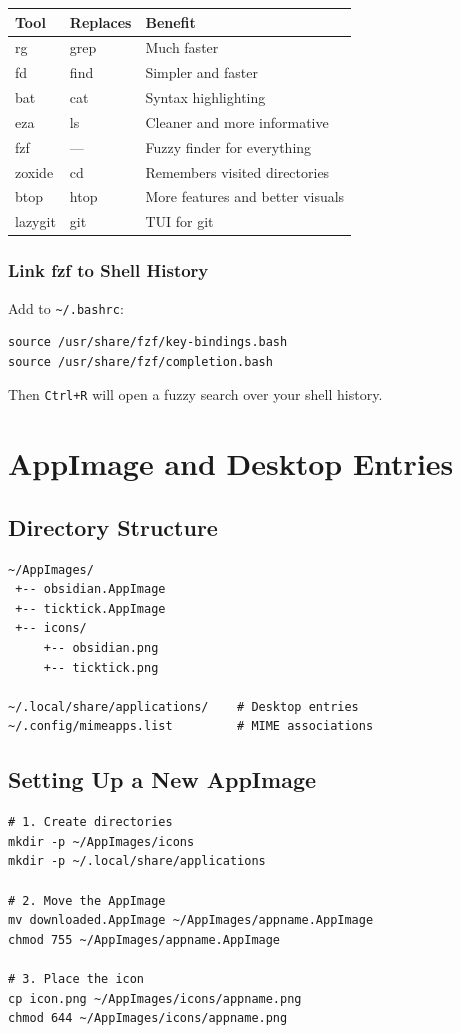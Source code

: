\documentclass[12pt, a4paper]{book}
\begin{document}
\begin{center}
\begin{tabularx}{0.9\textwidth}{llL}
\toprule
\textbf{Tool} & \textbf{Replaces} & \textbf{Benefit} \\
\midrule
rg      & grep  & Much faster \\
fd      & find  & Simpler and faster \\
bat     & cat   & Syntax highlighting \\
eza     & ls    & Cleaner and more informative \\
fzf     & ---   & Fuzzy finder for everything \\
zoxide  & cd    & Remembers visited directories \\
btop    & htop  & More features and better visuals \\
lazygit & git   & TUI for git \\
\bottomrule
\end{tabularx}
\end{center}

\subsection{Link fzf to Shell History}
Add to \texttt{\textasciitilde/.bashrc}:
\begin{lstlisting}
source /usr/share/fzf/key-bindings.bash
source /usr/share/fzf/completion.bash
\end{lstlisting}
Then \texttt{Ctrl+R} will open a fuzzy search over your shell history.

\chapter{AppImage and Desktop Entries}

\section{Directory Structure}
\begin{lstlisting}
~/AppImages/
 +-- obsidian.AppImage
 +-- ticktick.AppImage
 +-- icons/
     +-- obsidian.png
     +-- ticktick.png

~/.local/share/applications/    # Desktop entries
~/.config/mimeapps.list         # MIME associations
\end{lstlisting}

\section{Setting Up a New AppImage}
\begin{lstlisting}
# 1. Create directories
mkdir -p ~/AppImages/icons
mkdir -p ~/.local/share/applications

# 2. Move the AppImage
mv downloaded.AppImage ~/AppImages/appname.AppImage
chmod 755 ~/AppImages/appname.AppImage

# 3. Place the icon
cp icon.png ~/AppImages/icons/appname.png
chmod 644 ~/AppImages/icons/appname.png
\end{lstlisting}
\end{document}
